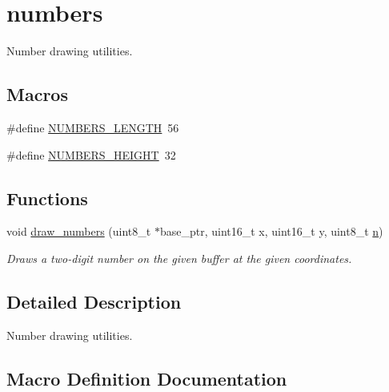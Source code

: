 \hypertarget{group__numbers}{}\section{numbers}
\label{group__numbers}


Number drawing utilities.  


\subsection*{Macros}
\begin{DoxyCompactItemize}
\item 
\#define \hyperlink{group__numbers_ga25023eab36552ec9843c325b07ba20f8}{N\+U\+M\+B\+E\+R\+S\+\_\+\+L\+E\+N\+G\+TH}~56
\item 
\#define \hyperlink{group__numbers_ga9950e4d72e16c9672a3f936a47d2897c}{N\+U\+M\+B\+E\+R\+S\+\_\+\+H\+E\+I\+G\+HT}~32
\end{DoxyCompactItemize}
\subsection*{Functions}
\begin{DoxyCompactItemize}
\item 
void \hyperlink{group__numbers_ga957a3e5ec5d985ee4c890b5f34ac9511}{draw\+\_\+numbers} (uint8\+\_\+t $\ast$base\+\_\+ptr, uint16\+\_\+t x, uint16\+\_\+t y, uint8\+\_\+t \hyperlink{projectiles_8c_a5a648f5ec00c526b0dfa2df7a272c6c0}{n})
\begin{DoxyCompactList}\small\item\em Draws a two-\/digit number on the given buffer at the given coordinates. \end{DoxyCompactList}\end{DoxyCompactItemize}


\subsection{Detailed Description}
Number drawing utilities. 



\subsection{Macro Definition Documentation}
\mbox{\label{group__numbers_ga9950e4d72e16c9672a3f936a47d2897c}} 
